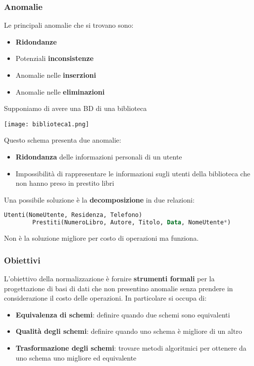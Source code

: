 \subsubsection{Anomalie}
Le principali anomalie che si trovano sono:
\begin{itemize}
	\item \textbf{Ridondanze}
	\item Potenziali \textbf{inconsistenze}
	\item Anomalie nelle \textbf{inserzioni}
	\item Anomalie nelle \textbf{eliminazioni}
\end{itemize}

\begin{example}
	Supponiamo di avere una BD di una biblioteca
	\begin{center}
		\texttt{[image: biblioteca1.png]}
	\end{center}
	Questo schema presenta due anomalie:
	\begin{itemize}
		\item \textbf{Ridondanza} delle informazioni personali di un utente
		\item Impossibilità di rappresentare le informazioni sugli utenti della biblioteca che non hanno preso in prestito libri
	\end{itemize}
	Una possibile soluzione è la \textbf{decomposizione} in due relazioni:
	\begin{lstlisting}[language=SQL]
		Utenti(NomeUtente, Residenza, Telefono)
		Prestiti(NumeroLibro, Autore, Titolo, Data, NomeUtente*)
	\end{lstlisting}
	Non è la soluzione migliore per costo di operazioni ma funziona.
\end{example}

\subsubsection{Obiettivi}
L'obiettivo della normalizzazione è fornire \textbf{strumenti formali} per la progettazione di basi di dati che non presentino anomalie senza prendere in considerazione il costo delle operazioni. In particolare si occupa di:
\begin{itemize}
	\item \textbf{Equivalenza di schemi}: definire quando due schemi sono equivalenti
	\item \textbf{Qualità degli schemi}: definire quando uno schema è migliore di un altro
	\item \textbf{Trasformazione degli schemi}: trovare metodi algoritmici per ottenere da uno schema uno migliore ed equivalente
\end{itemize}

